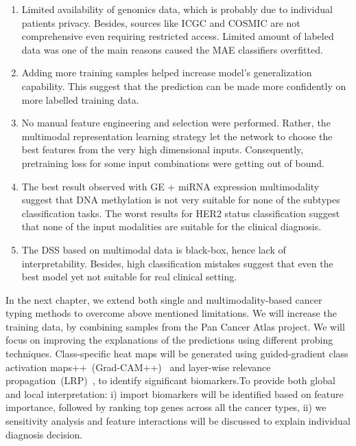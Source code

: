 \begin{enumerate}[noitemsep]
    \item Limited availability of genomics data, which is probably due to individual patients privacy. Besides, sources like ICGC and COSMIC are not comprehensive even requiring restricted access. Limited amount of labeled data was one of the main reasons caused the MAE classifiers overfitted. 
    
    \item Adding more training samples helped increase model's generalization capability. This suggest that the prediction can be made more confidently on more labelled training data. 
    
    \item No manual feature engineering and selection were performed. Rather, the multimodal representation learning strategy let the network to choose the best features from the very high dimensional inputs. Consequently, pretraining loss for some input combinations were getting out of bound. 

    \item The best result observed with GE + miRNA expression  multimodality suggest that DNA methylation is not very suitable for none of the subtypes classification tasks. The worst results for HER2 status classification suggest that none of the input modalities are suitable for the clinical diagnosis. 
    
    \item The DSS based on multimodal data is black-box, hence lack of interpretability. Besides, high classification mistakes suggest that even the best model yet not suitable for real clinical setting.
\end{enumerate}

\hspace*{3.5mm} In the next chapter, we extend both single and multimodality-based cancer typing methods to overcome above mentioned limitations. We will increase the training data, by combining samples from the Pan Cancer Atlas project. We will focus on improving the explanations of the predictions using different probing techniques.
Class-specific heat maps will be generated using guided-gradient class activation maps++~(Grad-CAM++)~\cite{chattopadhay2018grad} and layer-wise relevance propagation~(LRP)~\cite{LRP3}, to identify significant biomarkers.To provide both global and local interpretation: i) import biomarkers will be identified based on feature importance, followed by ranking top genes across all the cancer types, ii) we sensitivity analysis and feature interactions will be discussed to explain individual diagnosis decision. 
